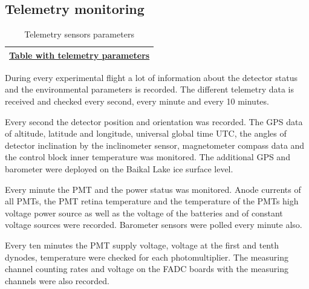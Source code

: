 \documentclass[final,5p,times,twocolumn]{elsarticle}
\begin{document}
\subsection{Telemetry monitoring\label{sect:telemetry}}



\begin{table}[bth]
\centering
\caption{Telemetry sensors parameters}
\label{tab:telemetry_sensors}
\vspace{1pc}
\begin{tabular}{||c||}
\hline
\href{https://docs.google.com/spreadsheets/d/1MEnVT2ue2mNZBabXCuhiacFWPkZbzGb2yeg4IZIXusI/edit?usp=sharing}{Table with telemetry parameters} \\
\hline
\end{tabular}

\end{table}

During every experimental flight a lot of information about the detector status and the environmental parameters is recorded. The different telemetry data is received and checked every second, every minute and every 10 minutes. 

Every second the detector position and orientation was recorded. The GPS data of altitude, latitude and longitude, universal global time UTC, the angles of detector inclination by the inclinometer sensor, magnetometer compass data and the control block inner temperature was monitored. The additional GPS and barometer were deployed on the Baikal Lake ice surface level.

Every minute the PMT and the power status was monitored. Anode currents of all PMTs, the PMT retina temperature and the temperature of the PMTs high voltage power source as well as the voltage of the batteries and of constant voltage sources were recorded. Barometer sensors were polled every minute also.

Every ten minutes the PMT supply voltage, voltage at the first and tenth dynodes, temperature were checked for each photomultiplier. The measuring channel counting rates and voltage on the FADC boards with the measuring channels were also recorded.
\end{document}
